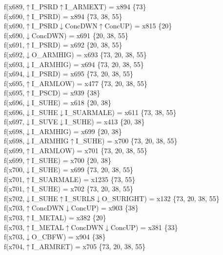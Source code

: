 f(x689,$\uparrow$I\_PSRD$\uparrow$I\_ARMEXT) = x894 \{73\} \\  
f(x690,$\uparrow$I\_PSRD) = x894 \{73, 38, 55\} \\  
f(x690,$\uparrow$I\_PSRD$\downarrow$ConcDWN$\uparrow$ConcUP) = x815 \{20\} \\  
f(x690,$\downarrow$ConcDWN) = x691 \{20, 38, 55\} \\  
f(x691,$\uparrow$I\_PSRD) = x692 \{20, 38, 55\} \\  
f(x692,$\downarrow$O\_ARMHIG) = x693 \{73, 20, 38, 55\} \\  
f(x693,$\downarrow$I\_ARMHIG) = x694 \{73, 20, 38, 55\} \\  
f(x694,$\downarrow$I\_PSRD) = x695 \{73, 20, 38, 55\} \\  
f(x695,$\uparrow$I\_ARMLOW) = x477 \{73, 20, 38, 55\} \\  
f(x695,$\uparrow$I\_PSCD) = x939 \{38\} \\  
f(x696,$\downarrow$I\_SUHE) = x618 \{20, 38\} \\  
f(x696,$\downarrow$I\_SUHE$\downarrow$I\_SUARMALE) = x611 \{73, 38, 55\} \\  
f(x697,$\downarrow$I\_SUVE$\downarrow$I\_SUHE) = x413 \{20, 38\} \\  
f(x698,$\downarrow$I\_ARMHIG) = x699 \{20, 38\} \\  
f(x698,$\downarrow$I\_ARMHIG$\uparrow$I\_SUHE) = x700 \{73, 20, 38, 55\} \\  
f(x699,$\uparrow$I\_ARMLOW) = x701 \{73, 20, 38, 55\} \\  
f(x699,$\uparrow$I\_SUHE) = x700 \{20, 38\} \\  
f(x700,$\downarrow$I\_SUHE) = x699 \{73, 20, 38, 55\} \\  
f(x701,$\uparrow$I\_SUARMALE) = x1235 \{73, 55\} \\  
f(x701,$\uparrow$I\_SUHE) = x702 \{73, 20, 38, 55\} \\  
f(x702,$\downarrow$I\_SUHE$\uparrow$I\_SURLS$\downarrow$O\_SURIGHT) = x132 \{73, 20, 38, 55\} \\  
f(x703,$\uparrow$ConcDWN$\downarrow$ConcUP) = x903 \{38\} \\  
f(x703,$\uparrow$I\_METAL) = x382 \{20\} \\  
f(x703,$\uparrow$I\_METAL$\uparrow$ConcDWN$\downarrow$ConcUP) = x381 \{33\} \\  
f(x703,$\downarrow$O\_CBFW) = x904 \{38\} \\  
f(x704,$\uparrow$I\_ARMRET) = x705 \{73, 20, 38, 55\} \\  
